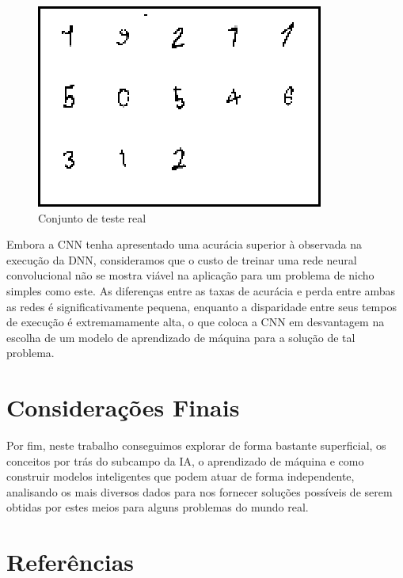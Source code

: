 \documentclass[a4paper, 12pt]{article}
\begin{document}
\begin{figure}[H]
    \centering
    \includegraphics[width=.9\textwidth]{Images/instance.png}
    \caption{Conjunto de teste real}
    \label{fig:exanpleFig4}
\end{figure}

Embora a CNN tenha apresentado uma acurácia superior à observada na execução da DNN, consideramos que o custo de treinar uma rede neural convolucional não se mostra viável na aplicação para um problema de nicho simples como este. As diferenças entre as taxas de acurácia e perda entre ambas as redes é significativamente pequena, enquanto a disparidade entre seus tempos de execução é extremamamente alta, o que coloca a CNN em desvantagem na escolha de um modelo de aprendizado de máquina para a solução de tal problema.

\section{Considerações Finais}

Por fim, neste trabalho conseguimos explorar de forma bastante superficial, os conceitos por trás do subcampo da IA, o aprendizado de máquina e como construir modelos inteligentes que podem atuar de forma independente, analisando os mais diversos dados para nos fornecer soluções possíveis de serem obtidas por estes meios para alguns problemas do mundo real.

\section*{Referências}
\end{document}
